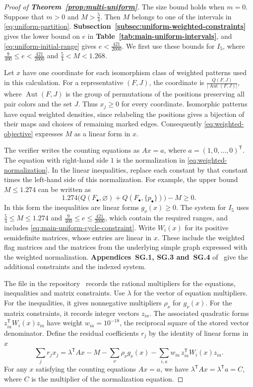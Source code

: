 \documentclass[preprint,11pt,numbers]{elsarticle-arxiv}
\numberwithin{equation}{section}
\theoremstyle{definition}
\newenvironment{lateproof}[1]{\begin{proof}[Proof of #1]}{\end{proof}}
\begin{document}
\begin{lateproof}{\textbf{Theorem~\ref{prop:multi-uniform}}}
The size bound holds when $m=0$. Suppose that $m>0$ and
$M>\frac54$. Then $M$ belongs to one of the intervals in
\eqref{eq:uniform-partition}. \textbf{Subsection~\ref{subsec:uniform-weighted-constraints}}
gives the lower bound on $e$ in \textbf{Table~\ref{tab:main-uniform-intervals}},
and \eqref{eq:uniform-initial-range} gives $e<\frac{421}{2000}$.
We first use these bounds for $I_5$, where
$\frac{9}{400}\leq e<\frac{421}{2000}$ and $\frac54<M<1.268$.

Let $x$ have one coordinate for each isomorphism class of
weighted patterns used in this calculation. For a representative
$(F,J)$, the coordinate is $\frac{Q(F,J)}{|\operatorname{Aut}(F,J)|}$,
where $\operatorname{Aut}(F,J)$ is the group of permutations of
the positions preserving all pair colors and the set $J$.
Thus $x_j\geq0$ for every coordinate. Isomorphic patterns
have equal weighted densities, since relabeling the positions
gives a bijection of their maps and choices of remaining
marked edges. Consequently \eqref{eq:weighted-objective}
expresses $M$ as a linear form in $x$.

The verifier writes the counting equations as $Ax=a$, where
$a=(1,0,\ldots,0)^{\mathsf T}$. The equation with right-hand
side $1$ is the normalization in \eqref{eq:weighted-normalization}.
In the linear inequalities, replace each constant by that
constant times the left-hand side of this normalization. For
example, the upper bound $M\leq1.274$ can be written as
\[
 1.274\bigl(Q(F_\bullet,\varnothing)+Q(F_\bullet,\{p_\bullet\})\bigr)
 -M\geq0.
\]
In this form the inequalities are linear forms $g_\nu(x)\geq0$.
The system for $I_5$ uses $\frac54\leq M\leq1.274$ and
$\frac{9}{400}\leq e\leq\frac{421}{2000}$, which contain the
required ranges, and includes
\eqref{eq:main-uniform-cycle-constraint}.
Write $W_i(x)$ for its positive semidefinite matrices,
whose entries are linear in $x$. These include the weighted
flag matrices and the matrices from the underlying simple
graph expressed with the weighted normalization.
\textbf{Appendices~SG.1, SG.3 and~SG.4}
of~\cite{FGSTSupplement} give the additional constraints and the
indexed system.

The file  in
the repository~\cite{FGSTCode} records the rational multipliers
for the equations, inequalities and matrix constraints. Use
$\lambda$ for the vector of equation multipliers. For the
inequalities, it gives nonnegative multipliers $\rho_\nu$
for $g_\nu(x)$. For the matrix constraints, it records integer
vectors $z_{ia}$. The associated quadratic forms
$z_{ia}^{\mathsf T}W_i(x)z_{ia}$ have weight
$w_{ia}=10^{-18}$, the reciprocal square of the stored
vector denominator.
Define the residual coefficients $r_j$ by the identity of
linear forms in $x$
\[
 \sum_j r_jx_j=\lambda^{\mathsf T}Ax-M
   -\sum_\nu\rho_\nu g_\nu(x)
   -\sum_{i,a}w_{ia}\,z_{ia}^{\mathsf T}W_i(x)z_{ia}.
\]
For any $x$ satisfying the counting equations $Ax=a$, we have
$\lambda^{\mathsf T}Ax=\lambda^{\mathsf T}a=C$, where $C$ is
the multiplier of the normalization equation.


\end{lateproof}
\end{document}
